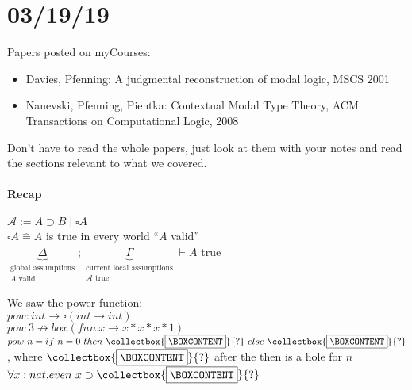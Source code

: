 \documentclass[12 pt]{article}
\newcommand{\mybox}{%
\collectbox{%
	\setlength{\fboxsep}{3pt}%
	\fbox{\BOXCONTENT}%
	}%
}
\begin{document}
       \section{03/19/19}
       Papers posted on myCourses:
       \begin{itemize}
       \item Davies, Pfenning: A judgmental reconstruction of modal
         logic, MSCS 2001
       \item Nanevski, Pfenning, Pientka: Contextual Modal Type
         Theory, ACM Transactions on Computational Logic, 2008
       \end{itemize}
       Don't have to read the whole papers, just look at them with
       your notes and read the sections relevant to what we covered.

       \paragraph{Recap}
       $\mathcal{A} := A \supset B \mid \square A$
       \\ $\square A \hat{=} A$ is true in every world ``$A$ valid''
       \\ $\underbrace{\Delta}_{\substack{\text{global assumptions}\\A
         \text{ valid}}};
       \underbrace{\Gamma}_{\substack{\text{current local
             assumptions}\\ \mathcal{A} \text{ true}}} \vdash
       A$ true
       \begin{prooftree}
       \end{prooftree}
       \begin{prooftree}
       \end{prooftree}
       \begin{prooftree}
       \end{prooftree}
       We saw the power function:
       \\$pow : int \to \square (int \to int)$
       \\ $pow\ 3 \nrightarrow box(fun\ x \to x * x * x * 1)$
       \\ $pow\ n = if\ n = 0 \ then \ \mybox{?}\ else\ \mybox{?}$,
       where $\mybox{?}$ after the then is a hole for $n$
       \\$\forall x : nat. even\ x \supset \mybox{?}$
\end{document}
